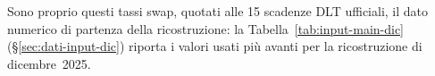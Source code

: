 \documentclass[11pt,a4paper]{article}
\theoremstyle{plain}
\theoremstyle{definition}
\theoremstyle{remark}
\newcommand{\UFR}{\mathrm{UFR}}
\newcommand{\FSP}{\mathrm{FSP}}
\begin{document}
Sono proprio questi tassi swap, quotati alle 15 scadenze DLT ufficiali, il dato numerico di
partenza della ricostruzione: la Tabella~\ref{tab:input-main-dic} (§\ref{sec:dati-input-dic})
riporta i valori usati pi\`u avanti per la ricostruzione di dicembre~2025.

%
%
%
%

\end{document}
